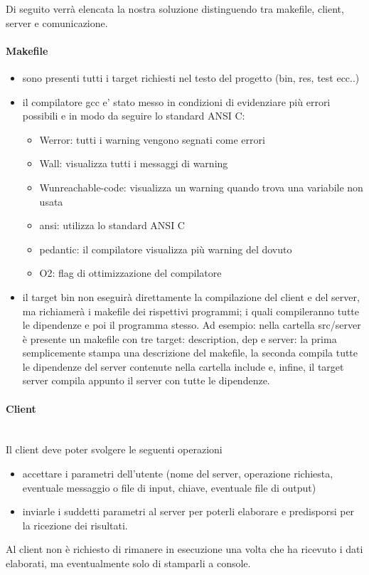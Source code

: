 \documentclass[12pt]{article}
\begin{document}
Di seguito verrà elencata la nostra soluzione distinguendo tra makefile, client, server e comunicazione.
\paragraph{Makefile}
\begin{itemize}
    \item sono presenti tutti i target richiesti nel testo del progetto (bin, res, test ecc..)
    \item il compilatore gcc e' stato messo in condizioni di evidenziare più errori possibili e in modo da seguire lo standard ANSI C:
    \begin{itemize}
        \item Werror: tutti i warning vengono segnati come errori    
        \item Wall: visualizza tutti i messaggi di warning
        \item Wunreachable-code: visualizza un warning quando trova una variabile non usata
        \item ansi: utilizza lo standard ANSI C
        \item pedantic: il compilatore visualizza più warning del dovuto
        \item O2: flag di ottimizzazione del compilatore
    \end{itemize}
    \item il target bin non eseguirà direttamente la compilazione del client e del server, ma richiamerà i makefile dei rispettivi programmi; i quali compileranno tutte le dipendenze e poi il programma stesso. Ad esempio: nella cartella src/server è presente un makefile con tre target: description, dep e server: la prima semplicemente stampa una descrizione del makefile, la seconda compila tutte le dipendenze del server contenute nella cartella include e, infine, il target server compila appunto il server con tutte le dipendenze. 
\end{itemize} 


\paragraph{Client} \mbox{}\\
Il client deve poter svolgere le seguenti operazioni
\begin{itemize}
    \item accettare i parametri dell'utente (nome del server, operazione richiesta, eventuale messaggio o file di input, chiave, eventuale file di output)
    \item inviarle i suddetti parametri  al server per poterli elaborare e predisporsi per la ricezione dei risultati.
\end{itemize}
Al client non è richiesto di rimanere in esecuzione una volta che ha ricevuto i dati elaborati, ma eventualmente solo di stamparli a console.
\end{document}

